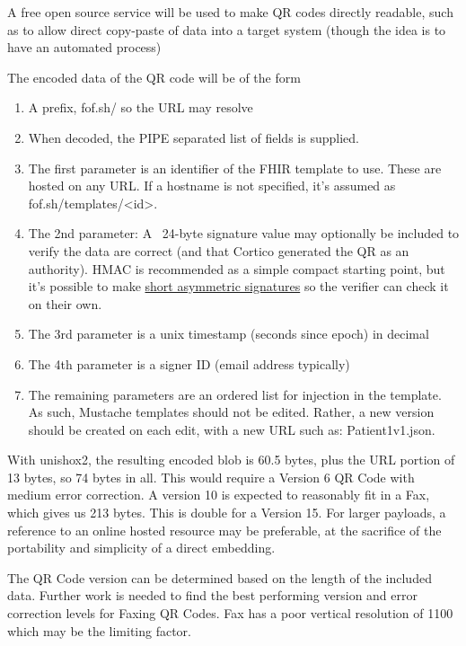 \documentclass[12pt,a4paper]{article}
\begin{document}
A free open source service will be used to make QR codes directly readable, such as to allow direct copy-paste of data into a target system (though the idea is to have an automated process)

The encoded data of the QR code will be of the form
\begin{enumerate}[label=\arabic*.]
\item A prefix, fof.sh/ so the URL may resolve
\item When decoded, the PIPE separated list of fields is supplied.
\item The first parameter is an identifier of the FHIR template to use. These are hosted on any URL. If a hostname is not specified, it’s assumed as fof.sh/templates/<id>.
\item The 2nd parameter:  A ~24-byte signature value may optionally be included to verify the data are correct (and that Cortico generated the QR as an authority). HMAC is recommended as a simple compact starting point, but it’s possible to make \href{https://crypto.stackexchange.com/questions/15356/how-do-i-create-a-short-signature-e-g-less-than-100-bytes}{short asymmetric signatures} so the verifier can check it on their own.
\item The 3rd parameter is a unix timestamp (seconds since epoch) in decimal
\item The 4th parameter is a signer ID (email address typically)
\item The remaining parameters are an ordered list for injection in the template. As such, Mustache templates should not be edited. Rather, a new version should be created on each edit, with a new URL such as: Patient1v1.json.
\end{enumerate}

With unishox2, the resulting encoded blob is 60.5 bytes, plus the URL portion of 13 bytes, so 74 bytes in all. This would require a Version 6 QR Code with medium error correction. A version 10 is expected to reasonably fit in a Fax, which gives us 213 bytes. This is double for a Version 15. For larger payloads, a reference to an online hosted resource may be preferable, at the sacrifice of the portability and simplicity of a direct embedding.

The QR Code version can be determined based on the length of the included data. Further work is needed to find the best performing version and error correction levels for Faxing QR Codes. Fax has a poor vertical resolution of 1100 which may be the limiting factor.
\end{document}
